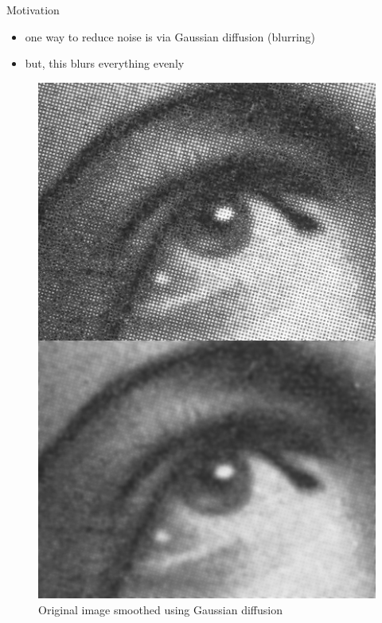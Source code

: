\documentclass{beamer}
\begin{document}
\begin{frame}{Motivation}
    
    
    \begin{itemize}
        \item one way to reduce noise is via Gaussian diffusion (blurring)
        \item but, this blurs everything evenly
    \end{itemize}
    
    \begin{figure}[h!]
            \centering            \includegraphics[scale=0.9]{gaussianblur.jpg}
            \caption{Original image smoothed using Gaussian diffusion}
    \end{figure}

\end{frame}
\end{document}
